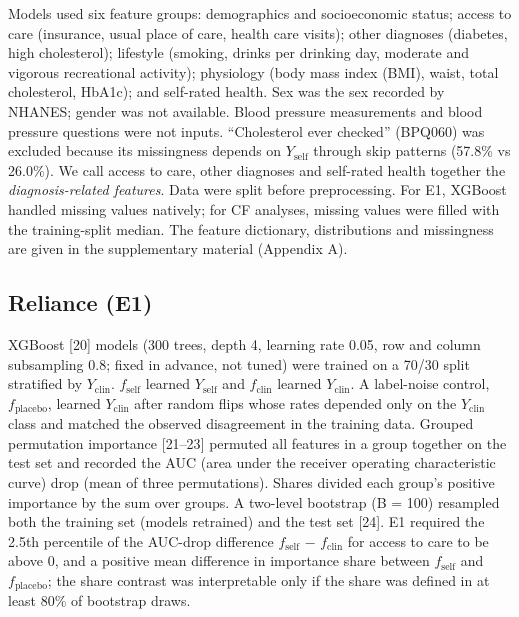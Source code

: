 \documentclass[final,5p,times,twocolumn]{elsarticle}
\begin{document}
Models used six feature groups: demographics and socioeconomic status;
access to care (insurance, usual place of care, health care visits);
other diagnoses (diabetes, high cholesterol); lifestyle (smoking, drinks
per drinking day, moderate and vigorous recreational activity);
physiology (body mass index (BMI), waist, total cholesterol, HbA1c); and
self-rated health. Sex was the sex recorded by NHANES; gender was not
available. Blood pressure measurements and blood pressure questions were
not inputs. ``Cholesterol ever checked'' (BPQ060) was excluded because
its missingness depends on \(Y_{\mathrm{self}}\) through skip patterns
(57.8\% vs 26.0\%). We call access to care, other diagnoses and
self-rated health together the \emph{diagnosis-related features}. Data
were split before preprocessing. For E1, XGBoost handled missing values
natively; for CF analyses, missing values were filled with the
training-split median. The feature dictionary, distributions and
missingness are given in the supplementary material (Appendix A).

\subsection{Reliance (E1)}

XGBoost {[}20{]} models (300 trees, depth 4, learning rate 0.05, row and
column subsampling 0.8; fixed in advance, not tuned) were trained on a
70/30 split stratified by \(Y_{\mathrm{clin}}\).
\emph{\(f_{\mathrm{self}}\)} learned \(Y_{\mathrm{self}}\) and
\emph{\(f_{\mathrm{clin}}\)} learned \(Y_{\mathrm{clin}}\). A
label-noise control, \emph{\(f_{\mathrm{placebo}}\)}, learned
\(Y_{\mathrm{clin}}\) after random flips whose rates depended only on
the \(Y_{\mathrm{clin}}\) class and matched the observed disagreement in
the training data. Grouped permutation importance {[}21--23{]} permuted
all features in a group together on the test set and recorded the AUC
(area under the receiver operating characteristic curve) drop (mean of
three permutations). Shares divided each group's positive importance by
the sum over groups. A two-level bootstrap (B = 100) resampled both the
training set (models retrained) and the test set {[}24{]}. E1 required
the 2.5th percentile of the AUC-drop difference \(f_{\mathrm{self}}\) −
\(f_{\mathrm{clin}}\) for access to care to be above 0, and a positive
mean difference in importance share between \(f_{\mathrm{self}}\) and
\(f_{\mathrm{placebo}}\); the share contrast was interpretable only if
the share was defined in at least 80\% of bootstrap draws.
\end{document}
